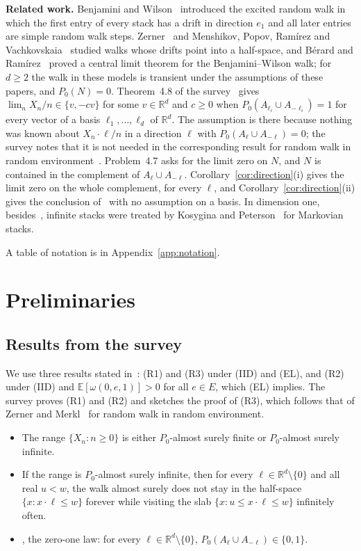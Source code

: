 \documentclass[11pt]{amsart}
\theoremstyle{remark}
\newcommand{\R}{\mathbb{R}}
\newcommand{\E}{\mathbb{E}}
\begin{document}
\medskip\noindent\textbf{Related work.} Benjamini and Wilson~\cite{BW03} introduced the excited random
walk in which the first entry of every stack has a drift in direction $e_1$ and all later entries are simple random
walk steps. Zerner~\cite{Zer06} and Menshikov, Popov, Ram\'irez and
Vachkovskaia~\cite{MPRV12} studied walks whose drifts point into a half-space, and B\'erard and Ram\'irez~\cite{BR07} proved
a central limit theorem for the Benjamini--Wilson walk; for $d\ge2$ the walk in these models is transient under the assumptions of these papers, and $P_0(N)=0$.
Theorem~4.8 of the survey~\cite{KZ13} gives $\lim_nX_n/n\in\{v,-cv\}$ for some $v\in\R^d$ and $c\ge0$ when
$P_0(A_{\ell_i}\cup A_{-\ell_i})=1$ for every vector of a basis $\ell_1,\dots,\ell_d$ of $\R^d$. The assumption is there
because nothing was known about $X_n\cdot\ell/n$ in a direction $\ell$ with $P_0(A_\ell\cup A_{-\ell})=0$; the survey
notes that it is not needed in the corresponding result for random walk in random environment~\cite[Theorem 1.5]{DR10}.
Problem~4.7 asks for the limit zero on $N$, and $N$ is contained in the complement of $A_\ell\cup A_{-\ell}$.
Corollary~\ref{cor:direction}(i) gives the limit zero on the whole complement, for every $\ell$, and
Corollary~\ref{cor:direction}(ii) gives the conclusion of~\cite[Theorem 4.8]{KZ13} with no assumption on a basis. In dimension one, besides~\cite{ABO16}, infinite stacks
were treated by Kosygina and Peterson~\cite{KP17} for Markovian stacks.

A table of notation is in Appendix~\ref{app:notation}.

\section{Preliminaries}\label{sec:prelim}

\subsection{Results from the survey}
We use three results stated in~\cite{KZ13}: (R1) and (R3) under (IID) and (EL), and (R2) under (IID) and
$\E[\omega(0,e,1)]>0$ for all $e\in E$, which (EL) implies. The survey proves (R1) and (R2) and sketches the proof of
(R3), which follows that of Zerner and Merkl~\cite[Proposition 3]{ZM01} for random walk in random environment.

\begin{itemize}
\item[(R1)] \cite[Theorem 2.5]{KZ13} The range $\{X_n:n\ge0\}$ is either $P_0$-almost surely finite or
$P_0$-almost surely infinite.
\item[(R2)] \cite[Lemma 3.18]{KZ13} If the range is $P_0$-almost surely infinite, then for every
$\ell\in\R^d\setminus\{0\}$ and all real $u<w$, the walk almost surely does not stay in the half-space
$\{x:x\cdot\ell\le w\}$ forever while visiting the slab $\{x:u\le x\cdot\ell\le w\}$ infinitely often.
\item[(R3)] \cite[Theorem 3.16]{KZ13}, the zero-one law: for every $\ell\in\R^d\setminus\{0\}$, $P_0(A_\ell\cup A_{-\ell})\in\{0,1\}$.
\end{itemize}
\end{document}
